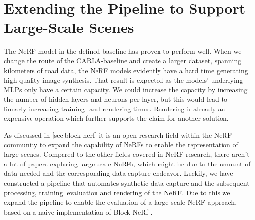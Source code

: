 \section{Extending the Pipeline to Support Large-Scale Scenes} \label{sec:method-block-nerf}

\begin{comment}
Premise: Have found the CARLA-baseline to work well on shorter segments. As discussed multiple papers, the capacity is limited.
Premise \#2: Since I operate in a synthetic environment, I have perfect poses which simplifies the process.
Question: How do I implement Block-NeRF in Nerfstudio, given perfect poses?

\begin{itemize}
    \item Split the dataset into multiple datasets
    \item Train each seperately
    \item Create a camera path
    \item Render the camera path for each NeRF
\end{itemize}
\end{comment}

The NeRF model in the defined baseline has proven to perform well. When we change the route of the CARLA-baseline and create a larger dataset, spanning kilometers of road data, the NeRF models evidently have a hard time generating high-quality image synthesis. That result is expected as the models' underlying MLPs only have a certain capacity. We could increase the capacity by increasing the number of hidden layers and neurons per layer, but this would lead to linearly increasing training -and rendering times. Rendering is already an expensive operation which further supports the claim for another solution.

As discussed in \autoref{sec:block-nerf} it is an open research field within the NeRF community to expand the capability of NeRFs to enable the representation of large scenes. Compared to the other fields covered in NeRF research, there aren't a lot of papers exploring large-scale NeRFs, which might be due to the amount of data needed and the corresponding data capture endeavor. Luckily, we have constructed a pipeline that automates synthetic data capture and the subsequent processing, training, evaluation and rendering of the NeRF. Due to this we expand the pipeline to enable the evaluation of a large-scale NeRF approach, based on a naive implementation of Block-NeRf \cite{tancik_block-nerf_2022}.

